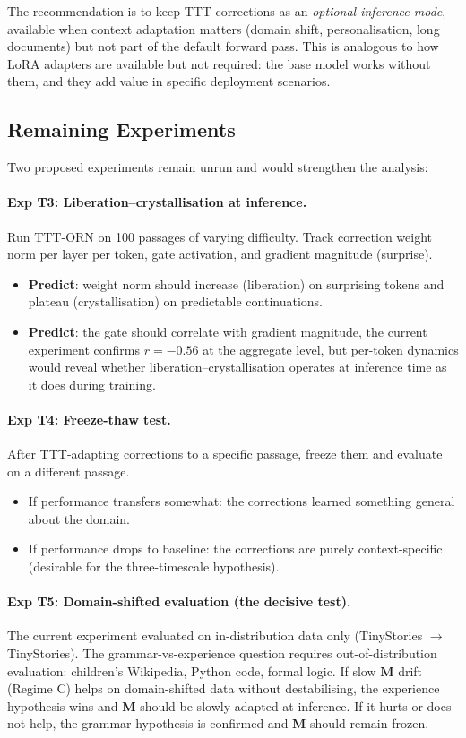 \documentclass[11pt, a4paper]{article}
\newcommand{\M}{\mathbf{M}}
\theoremstyle{plain}
\theoremstyle{definition}
\theoremstyle{remark}
\begin{document}
The recommendation is to keep TTT corrections as an \emph{optional inference mode}, available when context adaptation matters (domain shift, personalisation, long documents) but not part of the default forward pass.
This is analogous to how LoRA adapters are available but not required: the base model works without them, and they add value in specific deployment scenarios.

\subsection{Remaining Experiments}
\label{sec:ttt-remaining}

Two proposed experiments remain unrun and would strengthen the analysis:

\paragraph{Exp T3: Liberation--crystallisation at inference.}
Run TTT-ORN on 100 passages of varying difficulty.
Track correction weight norm per layer per token, gate activation, and gradient magnitude (surprise).
\begin{itemize}[nosep]
\item \textbf{Predict}: weight norm should increase (liberation) on surprising tokens and plateau (crystallisation) on predictable continuations.
\item \textbf{Predict}: the gate should correlate with gradient magnitude, the current experiment confirms $r = -0.56$ at the aggregate level, but per-token dynamics would reveal whether liberation--crystallisation operates at inference time as it does during training.
\end{itemize}

\paragraph{Exp T4: Freeze-thaw test.}
After TTT-adapting corrections to a specific passage, freeze them and evaluate on a different passage.
\begin{itemize}[nosep]
\item If performance transfers somewhat: the corrections learned something general about the domain.
\item If performance drops to baseline: the corrections are purely context-specific (desirable for the three-timescale hypothesis).
\end{itemize}

\paragraph{Exp T5: Domain-shifted evaluation (the decisive test).}
The current experiment evaluated on in-distribution data only (TinyStories $\to$ TinyStories).
The grammar-vs-experience question requires out-of-distribution evaluation: children's Wikipedia, Python code, formal logic.
If slow $\M$ drift (Regime C) helps on domain-shifted data without destabilising, the experience hypothesis wins and $\M$ should be slowly adapted at inference.
If it hurts or does not help, the grammar hypothesis is confirmed and $\M$ should remain frozen.
\end{document}
